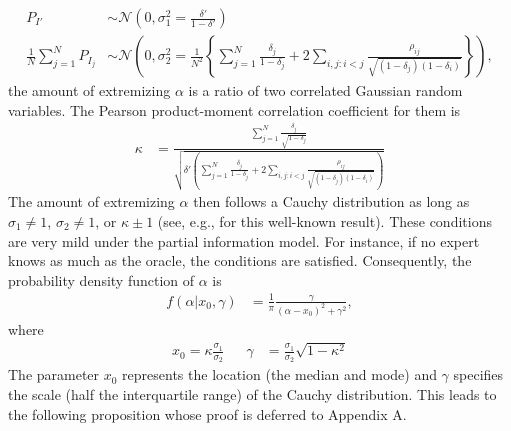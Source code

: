 \documentclass[11pt]{article}
\theoremstyle{definition}
\theoremstyle{definition}
\begin{document}
\begin{align*}
P_{I'} &\sim \mathcal{N}\left(0, \sigma^2_{1} = \frac{\delta'}{1-\delta'} \right)\\
\frac{1}{N}\sum_{j=1}^N P_{I_j} &\sim \mathcal{N}\left(0, \sigma^2_{2} =\frac{1}{N^2} \left\{ \sum_{j=1}^N \frac{\delta_j}{1-\delta_j} + 2 \sum_{i,j: i<j} \frac{\rho_{ij}}{\sqrt{(1-\delta_j)(1-\delta_i)}}\right\} \right),
\end{align*}
the amount of extremizing $\alpha$ is a ratio of two correlated Gaussian random variables. The Pearson product-moment correlation coefficient for them is
\begin{align*}
\kappa  &= \frac{ \sum_{j=1}^N \frac{\delta_j}{\sqrt{1-\delta_j}}}{\sqrt{\delta'  \left( \sum_{j=1}^N \frac{\delta_j}{1-\delta_j} + 2 \sum_{i,j: i<j} \frac{\rho_{ij}}{\sqrt{(1-\delta_j)(1-\delta_i)}}\right)}}
\end{align*}
The amount of extremizing $\alpha$ then follows a Cauchy distribution as long as $\sigma_1 \neq 1$, $\sigma_2 \neq 1$, or $\kappa \pm 1$ (see, e.g., \citet{cedilnik2004distribution} for this well-known result). These conditions are very mild under the partial information model. For instance, if no expert knows as much as the oracle, the conditions are satisfied. Consequently, the probability density function of $\alpha$ is
\begin{align*}
f(\alpha | x_0, \gamma) &= \frac{1}{\pi} \frac{\gamma}{(\alpha-x_0)^2+\gamma^2}, 
\end{align*}
where 
\begin{align*}
x_0 = \kappa \frac{\sigma_1}{\sigma_2} && \gamma &= \frac{\sigma_1}{\sigma_2} \sqrt{1-\kappa^2}
\end{align*}
The parameter $x_0$ represents the location (the median and mode) and $\gamma$ specifies the scale (half the interquartile range) of the Cauchy distribution. This leads to the following proposition whose proof is deferred to Appendix A.
\end{document}
